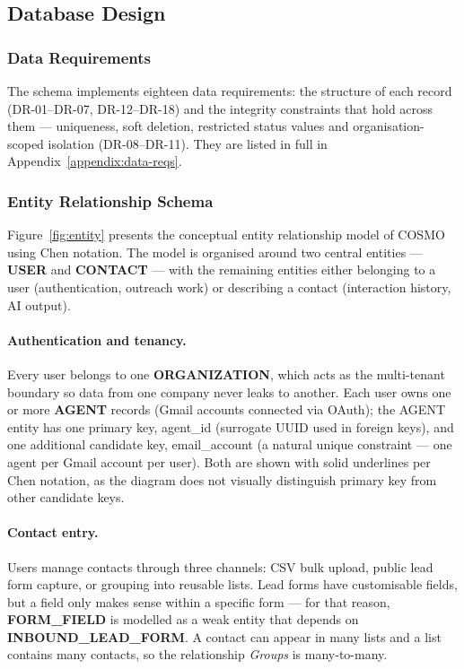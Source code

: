\documentclass[a4paper]{article}
\begin{document}
\subsection{Database Design}
\subsubsection{Data Requirements}

The schema implements eighteen data requirements: the structure of each
record (DR-01--DR-07, DR-12--DR-18) and the integrity constraints that hold
across them --- uniqueness, soft deletion, restricted status values and
organisation-scoped isolation (DR-08--DR-11). They are listed in full in
Appendix~\ref{appendix:data-reqs}.

\subsubsection{Entity Relationship Schema}
\label{sec:entity}

Figure~\ref{fig:entity} presents the conceptual entity relationship model
of COSMO using Chen notation. The model is organised around two
central entities --- \textbf{USER} and \textbf{CONTACT} --- with the
remaining entities either belonging to a user (authentication, outreach
work) or describing a contact (interaction history, AI output).

\paragraph{Authentication and tenancy.}
Every user belongs to one \textbf{ORGANIZATION}, which acts as the
multi-tenant boundary so data from one company never leaks to another.
Each user owns one or more \textbf{AGENT} records (Gmail accounts
connected via OAuth); the AGENT entity has one primary key, agent\_id (surrogate UUID used
in foreign keys), and one additional candidate key, email\_account
(a natural unique constraint --- one agent per Gmail account per
user). Both are shown with solid underlines per Chen notation, as
the diagram does not visually distinguish primary key from other
candidate keys.

\paragraph{Contact entry.}
Users manage contacts through three channels: CSV bulk upload, public
lead form capture, or grouping into reusable lists. Lead forms have
customisable fields, but a field only makes sense within a specific form
--- for that reason, \textbf{FORM\_FIELD} is modelled as a weak entity
that depends on \textbf{INBOUND\_LEAD\_FORM}. A contact can appear in
many lists and a list contains many contacts, so the relationship
\textit{Groups} is many-to-many.
\end{document}
